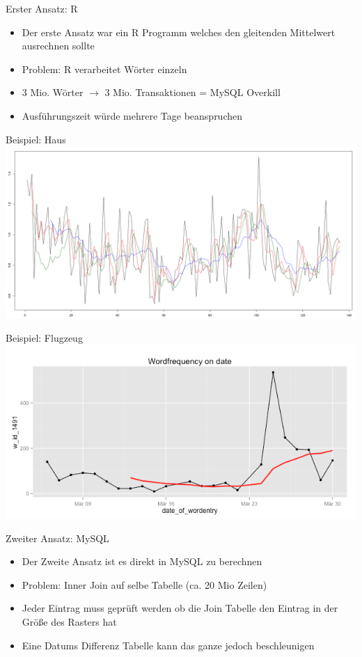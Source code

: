 \documentclass{beamer}
\begin{document}
\begin{frame}{Erster Ansatz: R}
	\begin{itemize}
		\item Der erste Ansatz war ein R Programm welches den gleitenden Mittelwert ausrechnen sollte
		\item Problem: R verarbeitet Wörter einzeln 
		\item 3 Mio. Wörter $\rightarrow$ 3 Mio. Transaktionen = MySQL Overkill
		\item Ausführungszeit würde mehrere Tage beanspruchen
	\end{itemize}
\end{frame}

\begin{frame}{Beispiel: Haus}
\includegraphics[scale=0.18]{Bilder/R.png}
\end{frame}

\begin{frame}{Beispiel: Flugzeug}
\includegraphics[scale=0.5]{Bilder/R2.png}
\end{frame}

\begin{frame}{Zweiter Ansatz: MySQL}
	\begin{itemize}
		\item Der Zweite Ansatz ist es direkt in MySQL zu berechnen
		\item Problem: Inner Join auf selbe Tabelle (ca. 20 Mio Zeilen)
		\item Jeder Eintrag muss geprüft werden ob die Join Tabelle den Eintrag in der Größe des Rasters hat
		\item Eine Datums Differenz Tabelle kann das ganze jedoch beschleunigen

	\end{itemize}
\end{frame}
\end{document}
